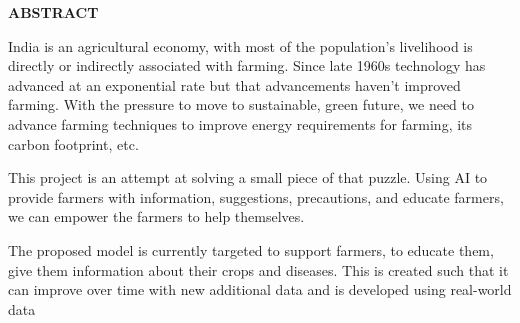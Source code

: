 \documentclass[../Report.tex]{subfiles}
\begin{document}
\begin{center}
    \textbf{ABSTRACT}
\end{center}

India is an agricultural economy, with most of the population's livelihood is directly or indirectly associated with farming. Since late 
1960s technology has advanced at an exponential rate but that advancements haven't improved farming. With the pressure to move to
sustainable, green future, we need to advance farming techniques to improve energy requirements for farming, its carbon footprint, etc. \par

This project is an attempt at solving a small piece of that puzzle. Using AI to provide farmers with information, suggestions, precautions,
and educate farmers, we can empower the farmers to help themselves.\par

The proposed model is currently targeted to support farmers, to educate them, give them information about their crops and diseases. This 
is created such that it can improve over time with new additional data and is developed using real-world data

\pagebreak
\end{document}
